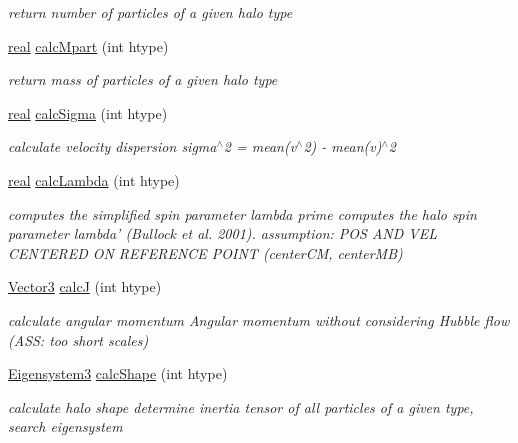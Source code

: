 \begin{DoxyCompactItemize}
\begin{DoxyCompactList}\small\item\em return number of particles of a given halo type \item\end{DoxyCompactList}\item 
\hyperlink{Global_8h_a031f8951175b43076c2084a6c2173410}{real} \hyperlink{classHalo_a24bcfddbfc2697c470c3b38c0c7fb80a}{calcMpart} (int htype)
\begin{DoxyCompactList}\small\item\em return mass of particles of a given halo type \item\end{DoxyCompactList}\item 
\hyperlink{Global_8h_a031f8951175b43076c2084a6c2173410}{real} \hyperlink{classHalo_a766603cf49235de1ba704f9b894a529d}{calcSigma} (int htype)
\begin{DoxyCompactList}\small\item\em calculate velocity dispersion sigma$^\wedge$2 = mean(v$^\wedge$2) -\/ mean(v)$^\wedge$2 \item\end{DoxyCompactList}\item 
\hyperlink{Global_8h_a031f8951175b43076c2084a6c2173410}{real} \hyperlink{classHalo_a5b2122f298d378a4f480df2da1c20e98}{calcLambda} (int htype)
\begin{DoxyCompactList}\small\item\em computes the simplified spin parameter lambda prime computes the halo spin parameter lambda' (Bullock et al. 2001). assumption: POS AND VEL CENTERED ON REFERENCE POINT (centerCM, centerMB) \item\end{DoxyCompactList}\item 
\hyperlink{classVector3}{Vector3} \hyperlink{classHalo_a09e095503613f4fe221f305773d9892d}{calcJ} (int htype)
\begin{DoxyCompactList}\small\item\em calculate angular momentum Angular momentum without considering Hubble flow (ASS: too short scales) \item\end{DoxyCompactList}\item 
\hyperlink{classEigensystem3}{Eigensystem3} \hyperlink{classHalo_a14c7d35c10f92e4635365cf6ce20248c}{calcShape} (int htype)
\begin{DoxyCompactList}\small\item\em calculate halo shape determine inertia tensor of all particles of a given type, search eigensystem \item\end{DoxyCompactList}\end{DoxyCompactItemize}


